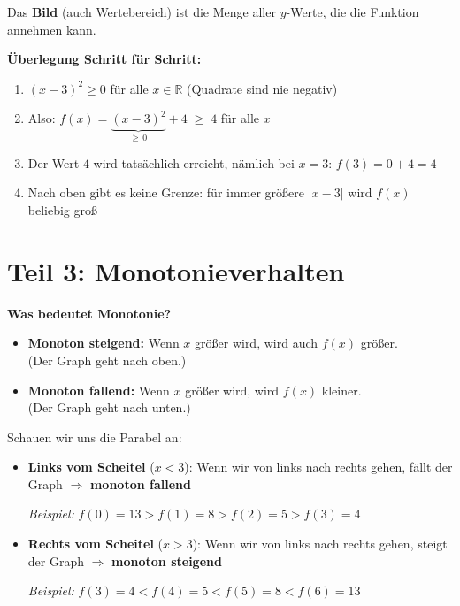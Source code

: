 \documentclass[12pt, a4paper]{article}
\begin{document}
Das \textbf{Bild} (auch Wertebereich) ist die Menge aller $y$-Werte, die die Funktion annehmen kann.

\textbf{Überlegung Schritt für Schritt:}

\begin{enumerate}
    \item $(x - 3)^2 \geq 0$ für alle $x \in \mathbb{R}$ \quad (Quadrate sind nie negativ)
    \item Also: $f(x) = \underbrace{(x-3)^2}_{\geq\, 0} + 4 \;\geq\; 4$ \quad für alle $x$
    \item Der Wert $4$ wird tatsächlich erreicht, nämlich bei $x = 3$: \quad $f(3) = 0 + 4 = 4$ \checkmark
    \item Nach oben gibt es keine Grenze: für immer größere $|x - 3|$ wird $f(x)$ beliebig groß
\end{enumerate}

\begin{center}
\fbox{%
    \parbox{0.5\textwidth}{%
        \centering
        \textbf{Bild von $f$:} $\quad f(\mathbb{R}) = [4,\, +\infty)$

        \vspace{0.3em}
        D.h. alle reellen Zahlen $\geq 4$.
    }%
}
\end{center}

\section*{Teil 3: Monotonieverhalten}

\textbf{Was bedeutet Monotonie?}
\begin{itemize}
    \item \textbf{Monoton steigend:} Wenn $x$ größer wird, wird auch $f(x)$ größer. \\ (Der Graph geht nach oben.)
    \item \textbf{Monoton fallend:} Wenn $x$ größer wird, wird $f(x)$ kleiner. \\ (Der Graph geht nach unten.)
\end{itemize}

Schauen wir uns die Parabel an:

\begin{itemize}
    \item \textbf{Links vom Scheitel} ($x < 3$): Wenn wir von links nach rechts gehen, fällt der Graph $\Rightarrow$ \textbf{monoton fallend}

    \textit{Beispiel:} $f(0) = 13 > f(1) = 8 > f(2) = 5 > f(3) = 4$ \checkmark

    \item \textbf{Rechts vom Scheitel} ($x > 3$): Wenn wir von links nach rechts gehen, steigt der Graph $\Rightarrow$ \textbf{monoton steigend}

    \textit{Beispiel:} $f(3) = 4 < f(4) = 5 < f(5) = 8 < f(6) = 13$ \checkmark
\end{itemize}
\end{document}
